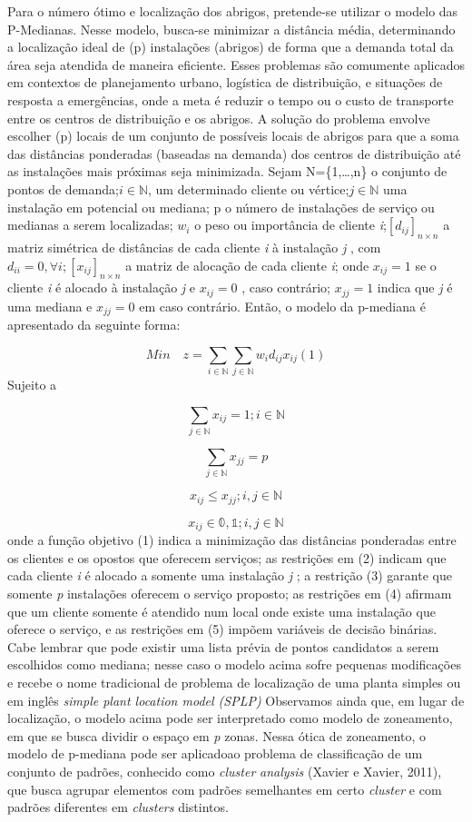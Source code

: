 \documentclass[
]{article}
\begin{document}
Para o número ótimo e localização dos abrigos, pretende-se utilizar o
modelo das P-Medianas. Nesse modelo, busca-se minimizar a distância
média, determinando a localização ideal de (p) instalações (abrigos) de
forma que a demanda total da área seja atendida de maneira eficiente.
Esses problemas são comumente aplicados em contextos de planejamento
urbano, logística de distribuição, e situações de resposta a
emergências, onde a meta é reduzir o tempo ou o custo de transporte
entre os centros de distribuição e os abrigos. A solução do problema
envolve escolher (p) locais de um conjunto de possíveis locais de
abrigos para que a soma das distâncias ponderadas (baseadas na demanda)
dos centros de distribuição até as instalações mais próximas seja
minimizada. Sejam N=\{1,\ldots,n\} o conjunto de pontos de
demanda;\(i \in \mathbb{N}\), um determinado cliente ou
vértice;\(j \in \mathbb{N}\) uma instalação em potencial ou mediana; p o
número de instalações de serviço ou medianas a serem localizadas;
\(w_i\) o peso ou importância de cliente
\emph{i};\([d_{ij}]_{n \times n}\) a matriz simétrica de distâncias de
cada cliente \emph{i} à instalação \emph{j} , com
\(d_{ii}=0, \forall i; [x_{ij}]_{n \times n}\) a matriz de alocação de
cada cliente \emph{i}; onde \(x_{ij}=1\) se o cliente \emph{i} é alocado
à instalação \emph{j} e \(x_{ij}=0\) , caso contrário; \(x_{jj}=1\)
indica que \emph{j} é uma mediana e \(x_{jj}=0\) em caso contrário.
Então, o modelo da p-mediana é apresentado da seguinte forma:

\[
Min \quad  z=\sum_{i \in \mathbb{N}} \sum_{j \in \mathbb{N}} w_{i}d_{ij}x_{ij}    (1)
\] Sujeito a

\[
\sum_{j \in \mathbb{N}}x_{ij}=1; i \in \mathbb{N}
\]

\[
\sum_{j \in \mathbb{N}}x_{jj}=p
\]

\[
x_{ij} \leq x_{jj}; i,j \in \mathbb{N}
\]

\[
x_{ij} \in \mathbb{0,1}; i,j \in \mathbb{N}\] onde a função objetivo (1)
indica a minimização das distâncias ponderadas entre os clientes e os
opostos que oferecem serviços; as restrições em (2) indicam que cada
cliente \emph{i} é alocado a somente uma instalação \emph{j} ; a
restrição (3) garante que somente \emph{p} instalações oferecem o
serviço proposto; as restrições em (4) afirmam que um cliente somente é
atendido num local onde existe uma instalação que oferece o serviço, e
as restrições em (5) impõem variáveis de decisão binárias. Cabe lembrar
que pode existir uma lista prévia de pontos candidatos a serem
escolhidos como mediana; nesse caso o modelo acima sofre pequenas
modificações e recebe o nome tradicional de problema de localização de
uma planta simples ou em inglês \emph{simple plant location model
(SPLP)} Observamos ainda que, em lugar de localização, o modelo acima
pode ser interpretado como modelo de zoneamento, em que se busca dividir
o espaço em \emph{p} zonas. Nessa ótica de zoneamento, o modelo de
p-mediana pode ser aplicadoao problema de classificação de um conjunto
de padrões, conhecido como \emph{cluster} \emph{analysis} (Xavier e
Xavier, 2011), que busca agrupar elementos com padrões semelhantes em
certo \emph{cluster} e com padrões diferentes em \emph{clusters}
distintos.
\end{document}
